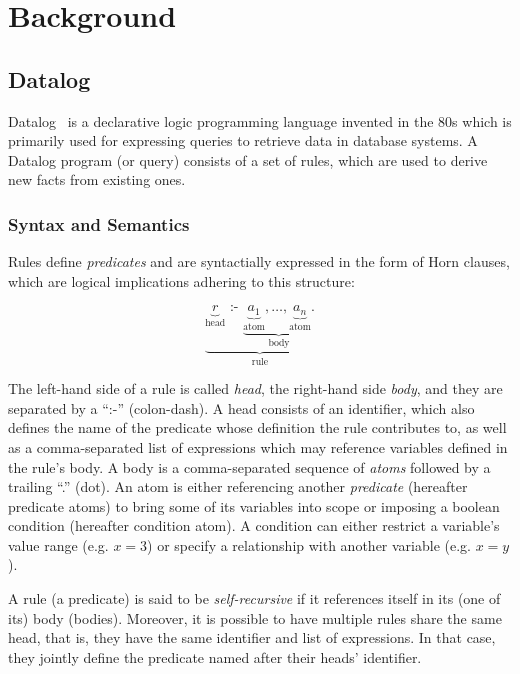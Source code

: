 
\chapter{Background}\label{ch:background}

\section{Datalog}\label{sec:datalog}

Datalog~\cite{green2013datalog} is a declarative logic programming language
invented in the 80s which is primarily used for expressing queries to retrieve
data in database systems.
A Datalog program (or query) consists of a set of rules, which are used to
derive new facts from existing ones.

\subsection{Syntax and Semantics}\label{sec:datalog-syntax-semantics}

Rules define \emph{predicates} and are syntactially expressed in the form of
Horn clauses, which are logical implications adhering to this structure:

\begin{equation}
	\underbrace{
	\underbrace{r}_{\text{head}}
	\text{ :- }
	\underbrace{
	\underbrace{a_1}_{\text{atom}},
	\ldots,
	\underbrace{a_n}_{\text{atom}}.
	}_{\text{body}}
	}_{\text{rule}}
\end{equation}

The left-hand side of a rule is called \emph{head}, the right-hand side \emph{body},
and they are separated by a ``:-'' (colon-dash).
A head consists of an identifier, which also defines the name of the predicate
whose definition the rule contributes to, as well as a comma-separated list of expressions
which may reference variables defined in the rule's body.
A body is a comma-separated sequence of \emph{atoms} followed by a trailing ``.'' (dot).
An atom is either referencing another \emph{predicate} (hereafter predicate atoms)
to bring some of its variables into scope or imposing a boolean condition
(hereafter condition atom).
A condition can either restrict a variable's value range (e.g. \(x = 3\))
or specify a relationship with another variable (e.g. \(x = y\)).

A rule (a predicate) is said to be \emph{self-recursive}
if it references itself in its (one of its) body (bodies).
Moreover, it is possible to have multiple rules share the same head, that is,
they have the same identifier and list of expressions.
In that case, they jointly define the predicate named after their heads' identifier.

